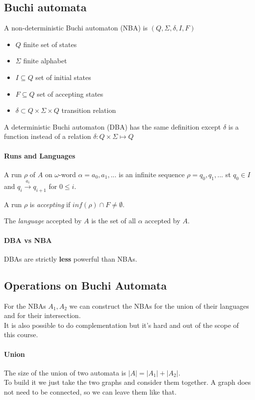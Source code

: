 \documentclass{article}
\begin{document}
\subsection{Buchi automata}
A non-deterministic Buchi automaton (NBA) is $(Q,\Sigma,\delta,I,F)$
\begin{itemize}
    \item $Q$ finite set of states
    \item $\Sigma$ finite alphabet
    \item $I\subseteq Q$ set of initial states
    \item $F\subseteq Q$ set of accepting states
    \item $\delta\subset Q\times\Sigma\times Q$ transition relation
\end{itemize}
A deterministic Buchi automaton (DBA) has the same definition except $\delta$ is a function instead of a relation $\delta:Q\times\Sigma\mapsto Q$

\paragraph{Runs and Languages} A run $\rho$ of $A$ on $\omega$-word $\alpha=a_0,a_1,...$ is an infinite sequence $\rho=q_0,q_1,...$ st $q_0\in I$ and $q_i\overset{a_i}\rightarrow q_{i+1}$ for $0\leq i$.

A run $\rho$ is \textit{accepting} if $inf(\rho)\cap F \neq \emptyset$.

The \textit{language} accepted by $A$ is the set of all $\alpha$ accepted by $A$.

\paragraph{DBA vs NBA}
DBAs are strictly \textbf{less} powerful than NBAs.

\subsection{Operations on Buchi Automata}
For the NBAs $A_1, A_2$ we can construct the NBAs for the union of their languages and for their intersection.\\
It is also possible to do complementation but it's hard and out of the scope of this course.

\paragraph{Union}
The size of the union of two automata is $|A| = |A_1| + |A_2|$.\\
To build it we just take the two graphs and consider them together. A graph does not need to be connected, so we can leave them like that.
\end{document}
